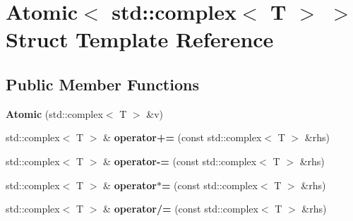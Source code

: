 \hypertarget{structAtomic_3_01std_1_1complex_3_01T_01_4_01_4}{}\section{Atomic$<$ std\+:\+:complex$<$ T $>$ $>$ Struct Template Reference}
\label{structAtomic_3_01std_1_1complex_3_01T_01_4_01_4}
\subsection*{Public Member Functions}
\begin{DoxyCompactItemize}
\item 
{\bfseries Atomic} (std\+::complex$<$ T $>$ \&v)\hypertarget{structAtomic_3_01std_1_1complex_3_01T_01_4_01_4_a429172c84e33b68d55b3daa4aa76de2e}{}\label{structAtomic_3_01std_1_1complex_3_01T_01_4_01_4_a429172c84e33b68d55b3daa4aa76de2e}

\item 
std\+::complex$<$ T $>$ \& {\bfseries operator+=} (const std\+::complex$<$ T $>$ \&rhs)\hypertarget{structAtomic_3_01std_1_1complex_3_01T_01_4_01_4_ab8b6ae61c3a7f429aad583b984bc7cb2}{}\label{structAtomic_3_01std_1_1complex_3_01T_01_4_01_4_ab8b6ae61c3a7f429aad583b984bc7cb2}

\item 
std\+::complex$<$ T $>$ \& {\bfseries operator-\/=} (const std\+::complex$<$ T $>$ \&rhs)\hypertarget{structAtomic_3_01std_1_1complex_3_01T_01_4_01_4_a8efe7bb5d46bb2c99c9f64a8947936d0}{}\label{structAtomic_3_01std_1_1complex_3_01T_01_4_01_4_a8efe7bb5d46bb2c99c9f64a8947936d0}

\item 
std\+::complex$<$ T $>$ \& {\bfseries operator$\ast$=} (const std\+::complex$<$ T $>$ \&rhs)\hypertarget{structAtomic_3_01std_1_1complex_3_01T_01_4_01_4_a8bee8f433212391e736d5ca3d8394e0e}{}\label{structAtomic_3_01std_1_1complex_3_01T_01_4_01_4_a8bee8f433212391e736d5ca3d8394e0e}

\item 
std\+::complex$<$ T $>$ \& {\bfseries operator/=} (const std\+::complex$<$ T $>$ \&rhs)\hypertarget{structAtomic_3_01std_1_1complex_3_01T_01_4_01_4_a28a8aeb205c2206abc0b0e67a0ffa322}{}\label{structAtomic_3_01std_1_1complex_3_01T_01_4_01_4_a28a8aeb205c2206abc0b0e67a0ffa322}

\end{DoxyCompactItemize}
